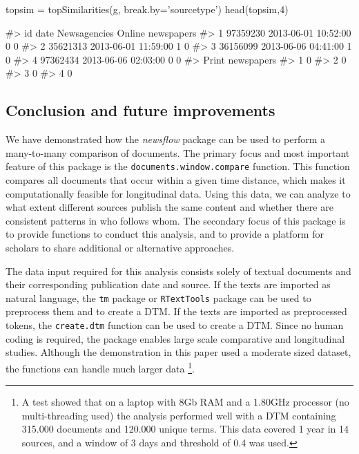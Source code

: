 \begin{Schunk}
\begin{Sinput}
topsim = topSimilarities(g, break.by='sourcetype')
head(topsim,4)
\end{Sinput}
\begin{Soutput}
#>         id                date Newsagencies Online newspapers
#> 1 97359230 2013-06-01 10:52:00            0                 0
#> 2 35621313 2013-06-01 11:59:00            1                 0
#> 3 36156099 2013-06-06 04:41:00            1                 0
#> 4 97362434 2013-06-06 02:03:00            0                 0
#>   Print newspapers
#> 1                0
#> 2                0
#> 3                0
#> 4                0
\end{Soutput}
\end{Schunk}

\subsection{Conclusion and future
improvements}\label{conclusion-and-future-improvements}

We have demonstrated how the \emph{newsflow} package can be used to
perform a many-to-many comparison of documents. The primary focus and
most important feature of this package is the
\texttt{documents.window.compare} function. This function compares all
documents that occur within a given time distance, which makes it
computationally feasible for longitudinal data. Using this data, we can
analyze to what extent different sources publish the same content and
whether there are consistent patterns in who follows whom. The secondary
focus of this package is to provide functions to conduct this analysis,
and to provide a platform for scholars to share additional or
alternative approaches.

The data input required for this analysis consists solely of textual
documents and their corresponding publication date and source. If the
texts are imported as natural language, the \texttt{tm} package or
\texttt{RTextTools} package can be used to preprocess them and to create
a DTM. If the texts are imported as preprocessed tokens, the
\texttt{create.dtm} function can be used to create a DTM. Since no human
coding is required, the package enables large scale comparative and
longitudinal studies. Although the demonstration in this paper used a
moderate sized dataset, the functions can handle much larger data
\footnote{A test showed that on a laptop with 8Gb RAM and a 1.80GHz
  processor (no multi-threading used) the analysis performed well with a
  DTM containing 315.000 documents and 120.000 unique terms. This data
  covered 1 year in 14 sources, and a window of 3 days and threshold of
  0.4 was used.}.

